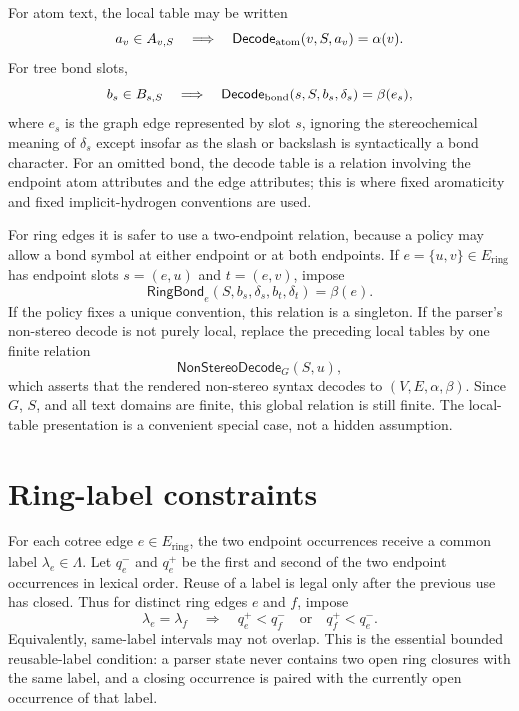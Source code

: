 \documentclass[10pt,a4paper]{article}
\newcommand{\Ring}{\mathrm{ring}}
\newcommand{\Decode}{\mathsf{Decode}}
\theoremstyle{definition}
\theoremstyle{remark}
\begin{document}
	For atom text, the local table may be written
	\[
	a_v\in A_{v,S}
	\quad\Longrightarrow\quad
	\Decode_{\rm atom}(v,S,a_v)=\alpha(v).
	\]
	For tree bond slots,
	\[
	b_s\in B_{s,S}
	\quad\Longrightarrow\quad
	\Decode_{\rm bond}(s,S,b_s,\delta_s)=\beta(e_s),
	\]
	where \(e_s\) is the graph edge represented by slot \(s\), ignoring the
	stereochemical meaning of \(\delta_s\) except insofar as the slash or backslash
	is syntactically a bond character.  For an omitted bond, the decode table is a
	relation involving the endpoint atom attributes and the edge attributes; this is
	where fixed aromaticity and fixed implicit-hydrogen conventions are used.

	For ring edges it is safer to use a two-endpoint relation, because a policy may
	allow a bond symbol at either endpoint or at both endpoints.  If
	\(e=\{u,v\}\in E_{\Ring}\) has endpoint slots \(s=(e,u)\) and \(t=(e,v)\), impose
	\[
	\mathsf{RingBond}_e(S,b_s,\delta_s,b_t,\delta_t)=\beta(e).
	\]
	If the policy fixes a unique convention, this relation is a singleton.  If the
	parser's non-stereo decode is not purely local, replace the preceding local
	tables by one finite relation
	\[
	\mathsf{NonStereoDecode}_G(S,u),
	\]
	which asserts that the rendered non-stereo syntax decodes to \((V,E,\alpha,\beta)\).
	Since \(G\), \(S\), and all text domains are finite, this global relation is
	still finite.  The local-table presentation is a convenient special case, not a
	hidden assumption.

	\section{Ring-label constraints}
	\label{s:ringlabels}

	For each cotree edge \(e\in E_{\Ring}\), the two endpoint occurrences receive a
	common label \(\lambda_e\in\Lambda\).  Let \(q_e^-\) and \(q_e^+\) be the first
	and second of the two endpoint occurrences in lexical order.  Reuse of a label
	is legal only after the previous use has closed.  Thus for distinct ring edges
	\(e\) and \(f\), impose
	\[
	\lambda_e=\lambda_f
	\quad\Longrightarrow\quad
	q_e^+<q_f^-\quad\text{or}\quad q_f^+<q_e^- .
	\]
	Equivalently, same-label intervals may not overlap.  This is the essential
	bounded reusable-label condition: a parser state never contains two open ring
	closures with the same label, and a closing occurrence is paired with the
	currently open occurrence of that label.
\end{document}

